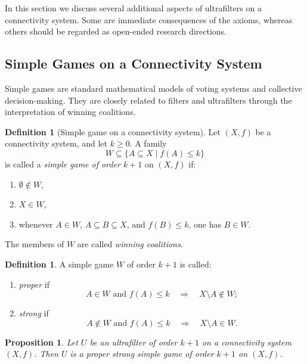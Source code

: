 \documentclass[10pt]{book}
\newtheorem{proposition}[theorem]{Proposition}
\theoremstyle{definition}
\newtheorem{definition}[theorem]{Definition}
\begin{document}
In this section we discuss several additional aspects of ultrafilters on a connectivity system.
Some are immediate consequences of the axioms, whereas others should be regarded as open-ended research directions.

\subsection{Simple Games on a Connectivity System}

Simple games are standard mathematical models of voting systems and collective decision-making.
They are closely related to filters and ultrafilters through the interpretation of winning coalitions.

\begin{definition}[Simple game on a connectivity system]
Let \((X,f)\) be a connectivity system, and let \(k\ge 0\).
A family
\[
W\subseteq \{A\subseteq X\mid f(A)\le k\}
\]
is called a \emph{simple game of order \(k+1\)} on \((X,f)\) if:
\begin{enumerate}
    \item[(SG1)] \(\emptyset\notin W\),
    \item[(SG2)] \(X\in W\),
    \item[(SG3)] whenever \(A\in W\), \(A\subseteq B\subseteq X\), and \(f(B)\le k\), one has \(B\in W\).
\end{enumerate}
The members of \(W\) are called \emph{winning coalitions}.
\end{definition}

\begin{definition}
A simple game \(W\) of order \(k+1\) is called:
\begin{enumerate}
    \item \emph{proper} if
    \[
    A\in W \text{ and } f(A)\le k
    \quad\Longrightarrow\quad
    X\setminus A\notin W;
    \]
    \item \emph{strong} if
    \[
    A\notin W \text{ and } f(A)\le k
    \quad\Longrightarrow\quad
    X\setminus A\in W.
    \]
\end{enumerate}
\end{definition}

\begin{proposition}
Let \(U\) be an ultrafilter of order \(k+1\) on a connectivity system \((X,f)\).
Then \(U\) is a proper strong simple game of order \(k+1\) on \((X,f)\).
\end{proposition}
\end{document}
